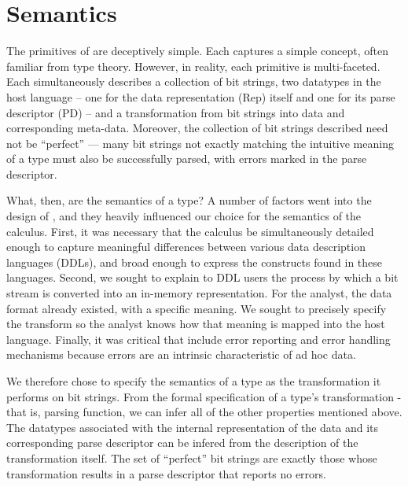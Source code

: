 \section{\ddc{} Semantics}

The primitives of \ddc{} are deceptively simple.  Each captures a
simple concept, often familiar from type theory. However, in reality,
each primitive is multi-faceted. Each simultaneously describes a
collection of bit strings, two datatypes in the host language -- one
for the data representation (Rep) itself and one for its parse
descriptor (PD) -- and a transformation from bit strings into data and
corresponding meta-data. Moreover, the collection of bit strings
described need not be ``perfect'' --- many bit strings not exactly
matching the intuitive meaning of a type must also be successfully
parsed, with errors marked in the parse descriptor.



What, then, are the semantics of a type? A number of factors went into
the design of \ddc{}, and they heavily influenced our choice for
the semantics of the calculus. First, it was necessary that the
calculus be simultaneously detailed enough to capture meaningful
differences between various data description languages (DDLs), 
and broad enough to express the constructs found in these languages.
Second, we sought to explain to DDL users the process by which
a bit stream is converted into an in-memory representation. For the
analyst, the data format already existed, with a specific meaning. We sought to precisely specify the transform so the
analyst knows how that meaning is mapped into the host language.
Finally, it was critical that \ddc{} include error reporting and
error handling mechanisms because errors are an intrinsic
characteristic of ad hoc data. 

We therefore chose to specify the semantics of a type as the
transformation it performs on bit strings. From the formal
specification of a type's transformation - that is, parsing function,
we can infer all of the other properties mentioned above.  The
datatypes associated with the internal representation of the data and
its corresponding parse descriptor can be infered from the description
of the transformation itself. The set of ``perfect'' bit strings are
exactly those whose transformation results in a parse descriptor that
reports no errors.

